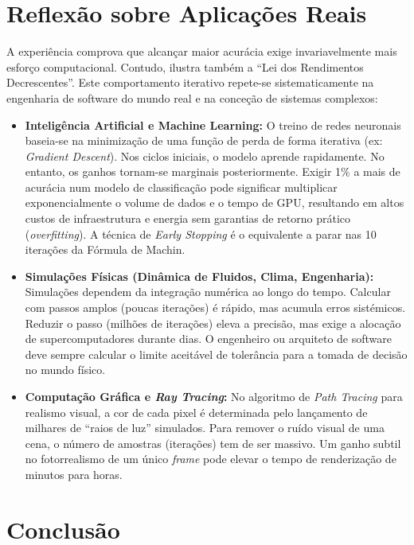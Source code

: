 \documentclass[a4paper,12pt]{article}
\begin{document}
\section{Reflexão sobre Aplicações Reais}

A experiência comprova que alcançar maior acurácia exige invariavelmente mais esforço computacional. Contudo, ilustra também a ``Lei dos Rendimentos Decrescentes''. Este comportamento iterativo repete-se sistematicamente na engenharia de software do mundo real e na conceção de sistemas complexos:

\begin{itemize}
    \item \textbf{Inteligência Artificial e Machine Learning:} O treino de redes neuronais baseia-se na minimização de uma função de perda de forma iterativa (ex: \textit{Gradient Descent}). Nos ciclos iniciais, o modelo aprende rapidamente. No entanto, os ganhos tornam-se marginais posteriormente. Exigir 1\% a mais de acurácia num modelo de classificação pode significar multiplicar exponencialmente o volume de dados e o tempo de GPU, resultando em altos custos de infraestrutura e energia sem garantias de retorno prático (\textit{overfitting}). A técnica de \textit{Early Stopping} é o equivalente a parar nas 10 iterações da Fórmula de Machin.
    \item \textbf{Simulações Físicas (Dinâmica de Fluidos, Clima, Engenharia):} Simulações dependem da integração numérica ao longo do tempo. Calcular com passos amplos (poucas iterações) é rápido, mas acumula erros sistémicos. Reduzir o passo (milhões de iterações) eleva a precisão, mas exige a alocação de supercomputadores durante dias. O engenheiro ou arquiteto de software deve sempre calcular o limite aceitável de tolerância para a tomada de decisão no mundo físico.
    \item \textbf{Computação Gráfica e \textit{Ray Tracing}:} No algoritmo de \textit{Path Tracing} para realismo visual, a cor de cada pixel é determinada pelo lançamento de milhares de ``raios de luz'' simulados. Para remover o ruído visual de uma cena, o número de amostras (iterações) tem de ser massivo. Um ganho subtil no fotorrealismo de um único \textit{frame} pode elevar o tempo de renderização de minutos para horas.
\end{itemize}

\section{Conclusão}
\end{document}
